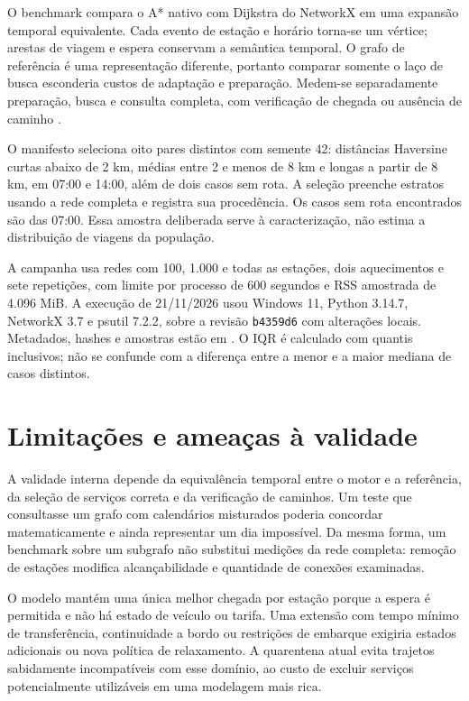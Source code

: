 \documentclass[12pt]{article}
\newcommand{\code}[1]{\texttt{#1}}
\begin{document}
O benchmark compara o A* nativo com Dijkstra do NetworkX em uma expansão temporal equivalente. Cada evento de estação e horário torna-se um vértice; arestas de viagem e espera conservam a semântica temporal. O grafo de referência é uma representação diferente, portanto comparar somente o laço de busca esconderia custos de adaptação e preparação. Medem-se separadamente preparação, busca e consulta completa, com verificação de chegada ou ausência de caminho \cite{networkx}.

O manifesto seleciona oito pares distintos com semente 42: distâncias Haversine curtas abaixo de 2 km, médias entre 2 e menos de 8 km e longas a partir de 8 km, em 07:00 e 14:00, além de dois casos sem rota. A seleção preenche estratos usando a rede completa e registra sua procedência. Os casos sem rota encontrados são das 07:00. Essa amostra deliberada serve à caracterização, não estima a distribuição de viagens da população.

A campanha usa redes com 100, 1.000 e todas as estações, dois aquecimentos e sete repetições, com limite por processo de 600 segundos e RSS amostrada de 4.096 MiB. A execução de 21/11/2026 usou Windows 11, Python 3.14.7, NetworkX 3.7 e psutil 7.2.2, sobre a revisão \code{b4359d6} com alterações locais. Metadados, hashes e amostras estão em . O IQR é calculado com quantis inclusivos; não se confunde com a diferença entre a menor e a maior mediana de casos distintos.



\section{Limitações e ameaças à validade}
A validade interna depende da equivalência temporal entre o motor e a referência, da seleção de serviços correta e da verificação de caminhos. Um teste que consultasse um grafo com calendários misturados poderia concordar matematicamente e ainda representar um dia impossível. Da mesma forma, um benchmark sobre um subgrafo não substitui medições da rede completa: remoção de estações modifica alcançabilidade e quantidade de conexões examinadas.

O modelo mantém uma única melhor chegada por estação porque a espera é permitida e não há estado de veículo ou tarifa. Uma extensão com tempo mínimo de transferência, continuidade a bordo ou restrições de embarque exigiria estados adicionais ou nova política de relaxamento. A quarentena atual evita trajetos sabidamente incompatíveis com esse domínio, ao custo de excluir serviços potencialmente utilizáveis em uma modelagem mais rica.
\end{document}
